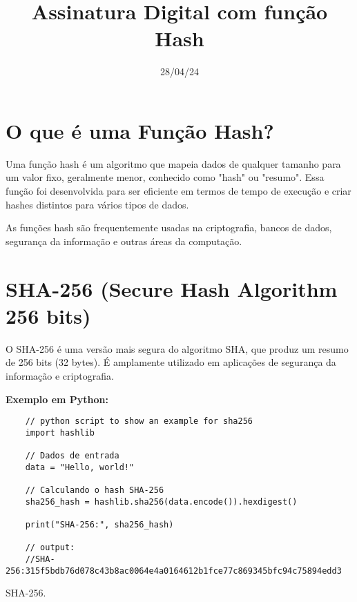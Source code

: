\documentclass[a4paper,12pt]{article}
\title{ \textbf{\large Assinatura Digital com fun\c{c}\~ao Hash}}
\author{}
\date{28/04/24}
\begin{document}
\maketitle




\section{O que é uma Função Hash?}
\hspace{0.5cm}Uma função hash é um algoritmo que mapeia dados de 
qualquer tamanho para um valor fixo, geralmente menor, conhecido como 
"hash" ou "resumo". Essa função foi desenvolvida para ser eficiente em 
termos de tempo de execução e criar hashes distintos para vários tipos 
de dados.

As funções hash são frequentemente usadas na criptografia, bancos de 
dados, segurança da informação e outras áreas da computação.

\section{SHA-256 (Secure Hash Algorithm 256 bits)}
\hspace{0.5cm}O SHA-256 é uma versão mais segura do algoritmo SHA, que 
produz um resumo de 256 bits (32 bytes). É amplamente utilizado em aplicações 
de segurança da informação e criptografia.

\textbf{Exemplo em Python:}

\begin{listing}[!ht]
    \begin{verbatim}
    // python script to show an example for sha256
    import hashlib

    // Dados de entrada
    data = "Hello, world!"

    // Calculando o hash SHA-256
    sha256_hash = hashlib.sha256(data.encode()).hexdigest()

    print("SHA-256:", sha256_hash)

    // output:
    //SHA-256:315f5bdb76d078c43b8ac0064e4a0164612b1fce77c869345bfc94c75894edd3
    \end{verbatim}
    \caption{SHA-256.}
    \label{listing:2}
\end{listing}
\end{document}
